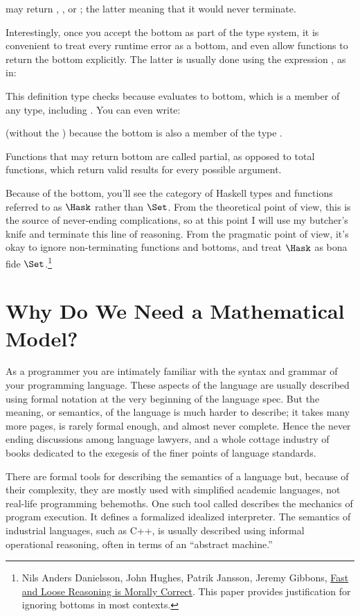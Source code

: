 may return , , or \code{\_|\_};
the latter meaning that it would never terminate.

Interestingly, once you accept the bottom as part of the type system, it
is convenient to treat every runtime error as a bottom, and even allow
functions to return the bottom explicitly. The latter is usually done
using the expression , as in:

This definition type checks because  evaluates to
bottom, which is a member of any type, including . You can
even write:

(without the ) because the bottom is also a member of the type
.

Functions that may return bottom are called partial, as opposed to total
functions, which return valid results for every possible argument.

Because of the bottom, you'll see the category of Haskell types and
functions referred to as $\Hask$ rather than $\Set$. From
the theoretical point of view, this is the source of never-ending
complications, so at this point I will use my butcher's knife and
terminate this line of reasoning. From the pragmatic point of view, it's
okay to ignore non-terminating functions and bottoms, and treat
$\Hask$ as bona fide $\Set$.\footnote{Nils Anders Danielsson,
John Hughes, Patrik Jansson, Jeremy Gibbons, \href{http://www.cs.ox.ac.uk/jeremy.gibbons/publications/fast+loose.pdf}{
Fast and Loose Reasoning is Morally Correct}. This paper provides justification for ignoring bottoms in most contexts.}

\section{Why Do We Need a Mathematical Model?}

As a programmer you are intimately familiar with the syntax and grammar
of your programming language. These aspects of the language are usually
described using formal notation at the very beginning of the language
spec. But the meaning, or semantics, of the language is much harder to
describe; it takes many more pages, is rarely formal enough, and almost
never complete. Hence the never ending discussions among language
lawyers, and a whole cottage industry of books dedicated to the exegesis
of the finer points of language standards.

There are formal tools for describing the semantics of a language but,
because of their complexity, they are mostly used with simplified
academic languages, not real-life programming behemoths. One such tool
called  describes the mechanics of program
execution. It defines a formalized idealized interpreter. The semantics
of industrial languages, such as C++, is usually described using
informal operational reasoning, often in terms of an ``abstract
machine.''

